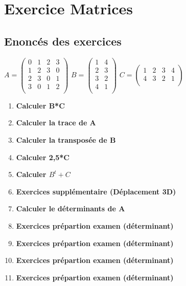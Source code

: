 
\newpage
\section{Exercice Matrices}
\vspace{10mm} %
\subsection{Enoncés des exercices}
\vspace{5mm} %

$
A =
\begin{pmatrix}
  0 & 1 & 2 & 3 \\
  1 & 2 & 3 & 0 \\
  2 & 3 & 0 & 1 \\
  3 & 0 & 1 & 2 \\
\end{pmatrix}
$
\vspace{3mm} %
$
B =
\begin{pmatrix}
  1 & 4 \\
  2 & 3 \\
  3 & 2 \\
  4 & 1 \\
\end{pmatrix}
$
\vspace{3mm} %
$
C =
\begin{pmatrix}
  1 & 2 & 3 & 4 \\
  4 & 3 & 2 & 1 \\
\end{pmatrix}
$

\begin{enumerate}[label=\Alph*)]
\item \textbf{Calculer B*C}
\item \textbf{Calculer la trace de A}
\item \textbf{Calculer la transposée de B}
\item \textbf{Calculer 2,5*C}
\item \textbf{Calculer $B^{t}+C$}
\item \textbf{Exercices supplémentaire (Déplacement 3D)}
\item \textbf{Calculer le déterminants de A}
\item \textbf{Exercices prépartion examen (déterminant)}
\item \textbf{Exercices prépartion examen (déterminant)}
\item \textbf{Exercices prépartion examen (déterminant)}
\item \textbf{Exercices prépartion examen (déterminant)}
\end{enumerate}

